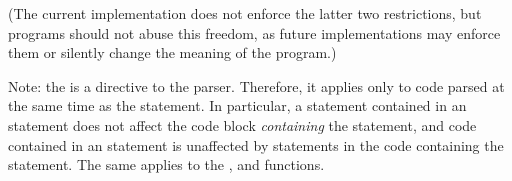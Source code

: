 (The current implementation does not enforce the latter two
restrictions, but programs should not abuse this freedom, as future
implementations may enforce them or silently change the meaning of the
program.)

Note: the  is a directive to the parser.  Therefore, it
applies only to code parsed at the same time as the 
statement.  In particular, a  statement contained in an
 statement does not affect the code block {\em containing}
the  statement, and code contained in an 
statement is unaffected by  statements in the code
containing the  statement.  The same applies to the
,  and  functions.
